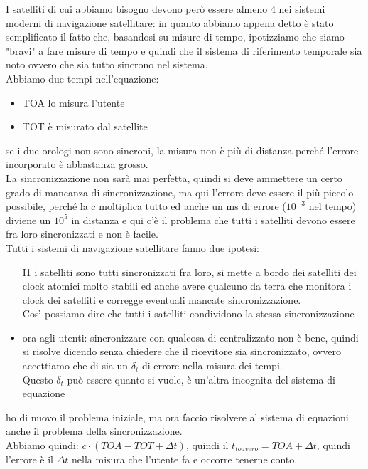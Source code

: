 \documentclass[oneside, 12pt]{extbook}
\begin{document}
I satelliti di cui abbiamo bisogno devono però essere almeno 4 nei sistemi moderni di navigazione satellitare: in quanto abbiamo appena detto è stato semplificato il fatto che, basandosi su misure di tempo, ipotizziamo che siamo "bravi" a fare misure di tempo e quindi che il sistema di riferimento temporale sia noto ovvero che sia tutto sincrono nel sistema.\\
Abbiamo due tempi nell'equazione:
\begin{itemize}
	\item TOA lo misura l'utente
	\item TOT è misurato dal satellite
\end{itemize}
se i due orologi non sono sincroni, la misura non è più di distanza perché l'errore incorporato è abbastanza grosso.\\
La sincronizzazione non sarà mai perfetta, quindi si deve ammettere un certo grado di mancanza di sincronizzazione, ma qui l'errore deve essere il più piccolo possibile, perché la c moltiplica tutto ed anche un ms di errore ($10^{-3}$ nel tempo) diviene un $10^5$ in distanza e qui c'è il problema che tutti i satelliti devono essere fra loro sincronizzati e non è facile.\\
Tutti i sistemi di navigazione satellitare fanno due ipotesi:
\begin{itemize}
	\item[I1] i satelliti sono tutti sincronizzati fra loro, si mette a bordo dei satelliti dei clock atomici molto stabili ed anche avere qualcuno da terra che monitora i clock dei satelliti e corregge eventuali mancate sincronizzazione.\\
	Così possiamo dire che tutti i satelliti condividono la stessa sincronizzazione
	\item ora agli utenti: sincronizzare con qualcosa di centralizzato non è bene, quindi si risolve dicendo senza chiedere che il ricevitore sia sincronizzato, ovvero accettiamo che di sia un $\delta_t$ di errore nella misura dei tempi.\\
	Questo $\delta_t$ può essere quanto si vuole, è un'altra incognita del sistema di equazione
\end{itemize}
ho di nuovo il problema iniziale, ma ora faccio risolvere al sistema di equazioni anche il problema della sincronizzazione.\\
Abbiamo quindi:
$c \cdot (TOA - TOT + \Delta t)$, quindi il $t_{toavero} = TOA + \Delta t$, quindi l'errore è il $\Delta t$ nella misura che l'utente fa e occorre tenerne conto.\\
\end{document}

